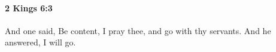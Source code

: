 
		\paragraph{2 Kings 6:3} %
			\label{2KINGS-6-3}

			And one said, Be content, I pray thee, and go with thy servants. And he answered, I will go.


